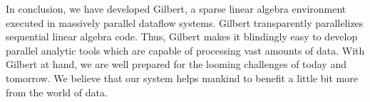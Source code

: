 In conclusion, we have developed Gilbert, a sparse linear algebra environment executed in massively parallel dataflow systems.
Gilbert transparently parallelizes sequential linear algebra code.
Thus, Gilbert makes it blindingly easy to develop parallel analytic tools which are capable of processing vast amounts of data.
With Gilbert at hand, we are well prepared for the looming challenges of today and tomorrow.
We believe that our system helps mankind to benefit a little bit more from the world of data.

